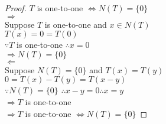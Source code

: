 \begin{proof}
	$T$ is one-to-one $\iff N(T)= \{0\}$\\
$\Rightarrow$ \\
Suppose $T$ is one-to-one and $x \in N(T)$\\
$T(x) = 0 = T(0)$ \\
$\because T$ is one-to-one $\therefore x = 0$ \\
$\Rightarrow N(T) = \{0\}$ \\
$\Leftarrow$ \\
Suppose $N(T) = \{0\}$ and $T(x) = T(y)$ \\
$0 = T(x)- T(y) = T(x-y)$ \\
$\because N(T) = \{0\}$ $\therefore x-y = 0 \therefore x=y$ \\
$\Rightarrow T$ is one-to-one \\
$\Rightarrow T$ is one-to-one $\iff N(T)= \{0\}$
\end{proof}



